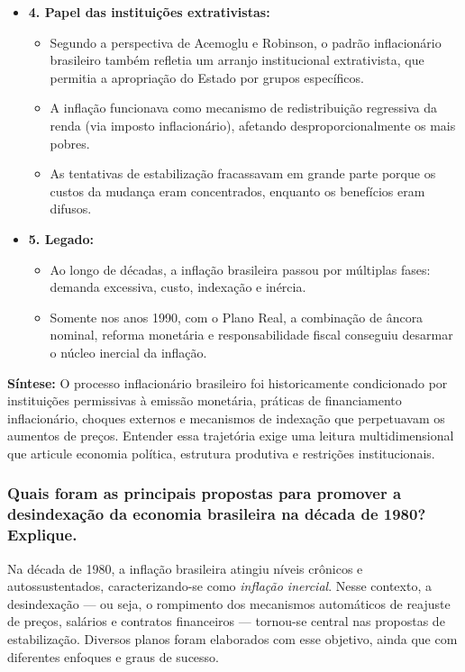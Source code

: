 \documentclass[a4paper,12pt]{article}[abntex2]
\begin{document}
\begin{itemize}
    \item \textbf{4. Papel das instituições extrativistas:}
    \begin{itemize}
        \item Segundo a perspectiva de Acemoglu e Robinson, o padrão inflacionário brasileiro também refletia um arranjo institucional extrativista, que permitia a apropriação do Estado por grupos específicos.
        \item A inflação funcionava como mecanismo de redistribuição regressiva da renda (via imposto inflacionário), afetando desproporcionalmente os mais pobres.
        \item As tentativas de estabilização fracassavam em grande parte porque os custos da mudança eram concentrados, enquanto os benefícios eram difusos.
    \end{itemize}

    \item \textbf{5. Legado:}
    \begin{itemize}
        \item Ao longo de décadas, a inflação brasileira passou por múltiplas fases: demanda excessiva, custo, indexação e inércia.
        \item Somente nos anos 1990, com o Plano Real, a combinação de âncora nominal, reforma monetária e responsabilidade fiscal conseguiu desarmar o núcleo inercial da inflação.
    \end{itemize}
\end{itemize}

\textbf{Síntese:} O processo inflacionário brasileiro foi historicamente condicionado por instituições permissivas à emissão monetária, práticas de financiamento inflacionário, choques externos e mecanismos de indexação que perpetuavam os aumentos de preços. Entender essa trajetória exige uma leitura multidimensional que articule economia política, estrutura produtiva e restrições institucionais.

\subsubsection{\textbf{Quais foram as principais propostas para promover a desindexação da economia brasileira na década de 1980? Explique.}}

Na década de 1980, a inflação brasileira atingiu níveis crônicos e autossustentados, caracterizando-se como \textit{inflação inercial}. Nesse contexto, a desindexação — ou seja, o rompimento dos mecanismos automáticos de reajuste de preços, salários e contratos financeiros — tornou-se central nas propostas de estabilização. Diversos planos foram elaborados com esse objetivo, ainda que com diferentes enfoques e graus de sucesso.
\end{document}
